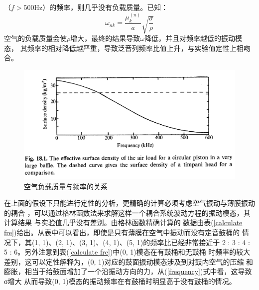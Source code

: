 \documentclass[a4paper]{ctexart}
\begin{document}
	（$f>500\mathrm{Hz}$）的频率，则几乎没有负载质量。已知：
	\begin{equation}
		\omega_{nk} = \frac{\mu_{k}^{(n)}}{a}\sqrt{\frac{\sigma}{\rho}}
		\label{frequency}
	\end{equation}
	空气的负载质量会使$\rho$增大，最终的结果导致$\omega$降低，并且对频率越低的振动模态，
	其频率的相对降低越严重，导致泛音列频率比值上升，与实验值定性上相吻合。
	\begin{figure}[htbp]
		\includegraphics[scale=0.32]{effective_mass.png}
		\centering 
		\caption{空气负载质量与频率的关系\cite{a}}
		\label{air loading p}
	\end{figure}
	\par 
	在上面的假设下只能进行定性的分析，更精确的计算必须考虑空气振动与薄膜振动的耦合
	，可以通过格林函数法来求解这样一个耦合系统波动方程的振动模态，其计算结果
	与实验值几乎没有差别\cite{Christian1984Effects}。由格林函数精确计算的
	数据由表(\ref{calculate fre})给出。从表中可以看出，即使是只有薄膜在空气中振动而没有定音鼓桶的
	情况下，其(1, 1)、(2, 1)、(3, 1)、(4, 1)、(5, 1)的频率比已经非常接近于
	2 : 3 : 4 : 5 : 6。另外注意到表(\ref{calculate fre})中(0, 1)模态在有鼓桶和无鼓桶
	时频率的较大差别，这可以定性解释为，(0, 1)对应的鼓面振动模态涉及到对鼓内空气的压缩
	和膨胀，相当于给鼓面增加了一个沿振动方向的力，从(\ref{frequency})式中看，这导致σ增大
	从而导致(0, 1)模态的振动频率在有鼓桶时明显高于没有鼓桶的情况。
\end{document}
